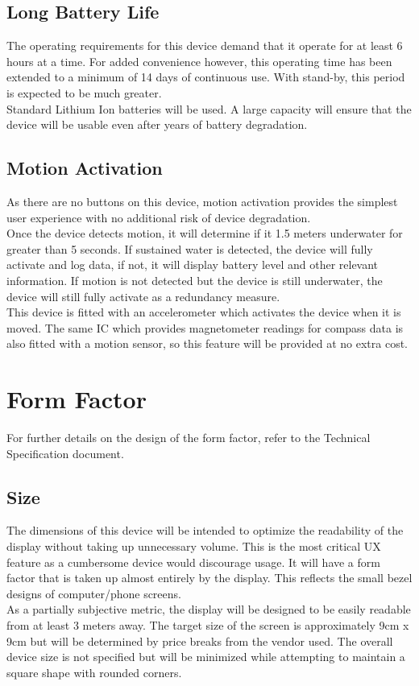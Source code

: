 \documentclass{article}
\begin{document}
\subsection{Long Battery Life}
The operating requirements for this device demand that it operate for at least 6 hours at a time. For added convenience however, this operating time has been extended to a minimum of 14 days of continuous use. With stand-by, this period is expected to be much greater.\\[12pt]
Standard Lithium Ion batteries will be used. A large capacity will ensure that the device will be usable even after years of battery degradation.

\subsection{Motion Activation}
As there are no buttons on this device, motion activation provides the simplest user experience with no additional risk of device degradation.\\[12pt]
Once the device detects motion, it will determine if it 1.5 meters underwater for greater than 5 seconds. If sustained water is detected, the device will fully activate and log data, if not, it will display battery level and other relevant information. If motion is not detected but the device is still underwater, the device will still fully activate as a redundancy measure.\\[12pt]
This device is fitted with an accelerometer which activates the device when it is moved. The same IC which provides magnetometer readings for compass data is also fitted with a motion sensor, so this feature will be provided at no extra cost.



\pagebreak

\section{Form Factor} %
For further details on the design of the form factor, refer to the Technical Specification document.

\subsection{Size}
The dimensions of this device will be intended to optimize the readability of the display without taking up unnecessary volume. This is the most critical UX feature as a cumbersome device would discourage usage. It will have a form factor that is taken up almost entirely by the display. This reflects the small bezel designs of computer/phone screens.\\[12pt]
As a partially subjective metric, the display will be designed to be easily readable from at least 3 meters away. The target size of the screen is approximately 9cm x 9cm but will be determined by price breaks from the vendor used. The overall device size is not specified but will be minimized while attempting to maintain a square shape with rounded corners.
\end{document}

